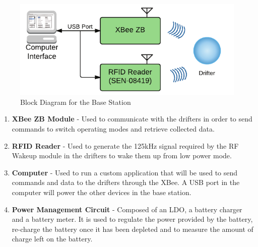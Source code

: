 \begin{figure}[ht]
	\centering
	\includegraphics[scale=1]{img/baseBlockDiagram}
	\caption{Block Diagram for the Base Station \label{fig:baseBlockDiagram}}
\end{figure}


\begin{enumerate}
\item \textbf{XBee ZB Module} -  Used to communicate with the drifters in order to send commands to switch operating modes and retrieve collected data.

\item \textbf{RFID Reader} - Used to generate the 125kHz signal required by the RF Wakeup module in the drifters to wake them up from low power mode.

\item \textbf{Computer} - Used to run a custom application that will be used to send commands and data to the drifters through the XBee.  A USB port in the computer will power the other devices in the base station.

\item \textbf{Power Management Circuit} - Composed of an LDO, a battery charger and a battery meter.  It is used to regulate the power provided by the battery, re-charge the battery once it has been depleted and to measure the amount of charge left on the battery.


\end{enumerate}
